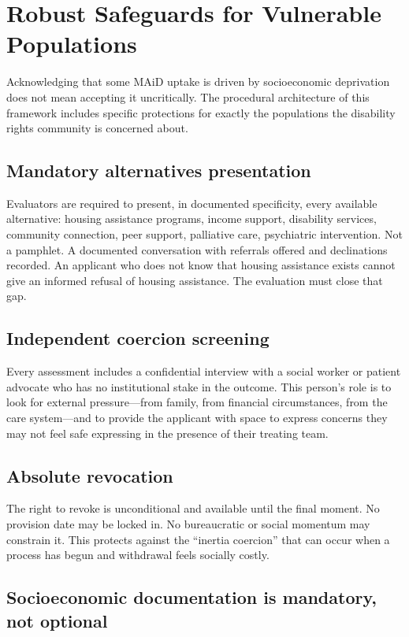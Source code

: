 \documentclass[11pt, letterpaper]{article}
\begin{document}
\section{Robust Safeguards for Vulnerable Populations}

Acknowledging that some MAiD uptake is driven by socioeconomic deprivation does not mean
accepting it uncritically. The procedural architecture of this framework includes specific
protections for exactly the populations the disability rights community is concerned about.

\subsection{Mandatory alternatives presentation}

Evaluators are required to present, in documented specificity, every available alternative:
housing assistance programs, income support, disability services, community connection,
peer support, palliative care, psychiatric intervention. Not a pamphlet. A documented
conversation with referrals offered and declinations recorded. An applicant who does not
know that housing assistance exists cannot give an informed refusal of housing assistance.
The evaluation must close that gap.

\subsection{Independent coercion screening}

Every assessment includes a confidential interview with a social worker or patient advocate
who has no institutional stake in the outcome. This person's role is to look for external
pressure---from family, from financial circumstances, from the care system---and to provide
the applicant with space to express concerns they may not feel safe expressing in the
presence of their treating team.

\subsection{Absolute revocation}

The right to revoke is unconditional and available until the final moment. No provision
date may be locked in. No bureaucratic or social momentum may constrain it. This protects
against the ``inertia coercion'' that can occur when a process has begun and withdrawal
feels socially costly.

\subsection{Socioeconomic documentation is mandatory, not optional}
\end{document}
